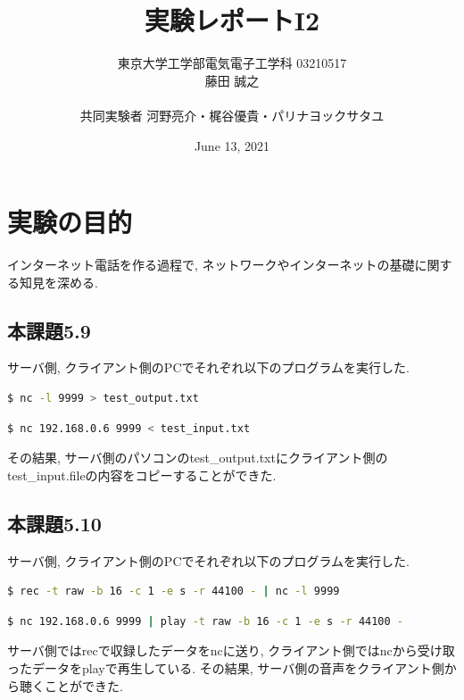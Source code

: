 \documentclass{ltjsarticle}
\title{実験レポートI2}
\author{東京大学工学部電気電子工学科 03210517\\藤田 誠之\\~\\ 共同実験者  河野亮介・梶谷優貴・パリナヨックサタユ}
\date{June 13, 2021}
\begin{document}
\maketitle

\section*{実験の目的}
インターネット電話を作る過程で, ネットワークやインターネットの基礎に関する知見を深める. 

\subsection*{本課題5.9}

サーバ側, クライアント側のPCでそれぞれ以下のプログラムを実行した. 
\begin{lstlisting}[caption=サーバ側,language=bash]
$ nc -l 9999 > test_output.txt
\end{lstlisting}
\begin{lstlisting}[caption=クライアント側,language=bash]
$ nc 192.168.0.6 9999 < test_input.txt
\end{lstlisting}
その結果, サーバ側のパソコンのtest\_output.txtにクライアント側のtest\_input.fileの内容をコピーすることができた. 


\subsection*{本課題5.10}
サーバ側, クライアント側のPCでそれぞれ以下のプログラムを実行した. 
\begin{lstlisting}[caption=サーバ側,language=bash]
$ rec -t raw -b 16 -c 1 -e s -r 44100 - | nc -l 9999
\end{lstlisting}
\begin{lstlisting}[caption=クライアント側,language=bash]
$ nc 192.168.0.6 9999 | play -t raw -b 16 -c 1 -e s -r 44100 -
\end{lstlisting}
サーバ側ではrecで収録したデータをncに送り, クライアント側ではncから受け取ったデータをplayで再生している. その結果, サーバ側の音声をクライアント側から聴くことができた. 
\end{document}
